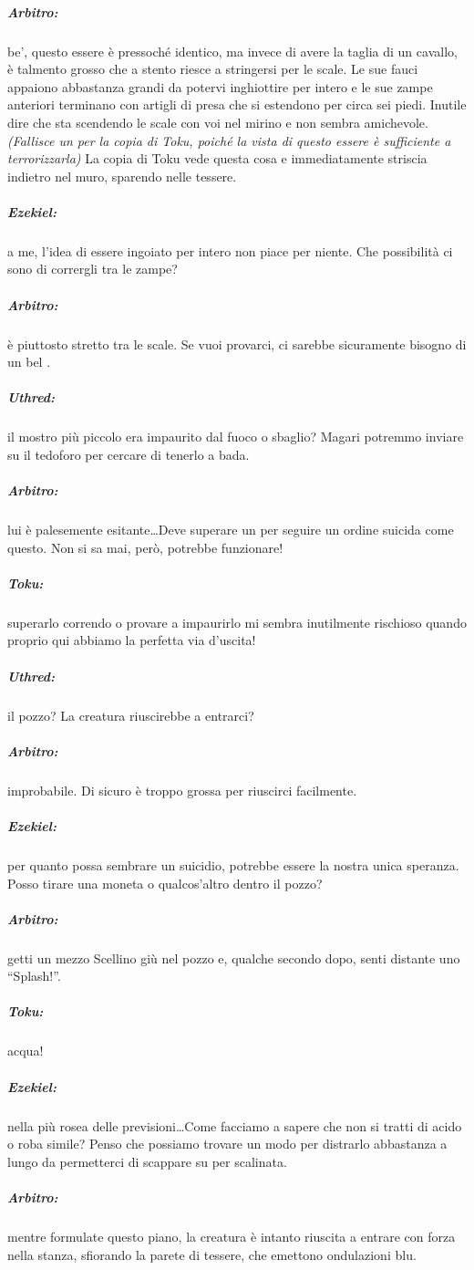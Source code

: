 \documentclass[itdr]{subfiles}
\begin{document}
{\subparagraph{Arbitro:} be', questo essere è pressoché identico, ma invece di avere la taglia di un cavallo, è talmento grosso che a stento riesce a stringersi per le scale. Le sue fauci appaiono abbastanza grandi da potervi inghiottire per intero e le sue zampe anteriori terminano con artigli di presa che si estendono per circa sei piedi. Inutile dire che sta scendendo le scale con voi nel mirino e non sembra amichevole. {\em (Fallisce un  per la copia di Toku, poiché la vista di questo essere è sufficiente a terrorizzarla)} La copia di Toku vede questa cosa e immediatamente striscia indietro nel muro, sparendo nelle tessere.

\subparagraph{Ezekiel:} a me, l'idea di essere ingoiato per intero non piace per niente. Che possibilità ci sono di corrergli tra le zampe?

\subparagraph{Arbitro:} è piuttosto stretto tra le scale. Se vuoi provarci, ci sarebbe sicuramente bisogno di un bel .

\subparagraph{Uthred:} il mostro più piccolo era impaurito dal fuoco o sbaglio? Magari potremmo inviare su il tedoforo per cercare di tenerlo a bada.

\subparagraph{Arbitro:} lui è palesemente esitante\ldots Deve superare un  per seguire un ordine suicida come questo. Non si sa mai, però, potrebbe funzionare!

\subparagraph{Toku:} superarlo correndo o provare a impaurirlo mi sembra inutilmente rischioso quando proprio qui abbiamo la perfetta via d'uscita!

\subparagraph{Uthred:} il pozzo? La creatura riuscirebbe a entrarci?

\subparagraph{Arbitro:} improbabile. Di sicuro è troppo grossa per riuscirci facilmente.

\subparagraph{Ezekiel:} per quanto possa sembrare un suicidio, potrebbe essere la nostra unica speranza. Posso tirare una moneta o qualcos'altro dentro il pozzo?

\subparagraph{Arbitro:} getti un mezzo Scellino giù nel pozzo e, qualche secondo dopo, senti distante uno \mbox{``Splash!''}.

\subparagraph{Toku:} acqua!

\subparagraph{Ezekiel:} nella più rosea delle previsioni\ldots Come facciamo a sapere che non si tratti di acido o roba simile? Penso che possiamo trovare un modo per distrarlo abbastanza a lungo da permetterci di scappare su per scalinata.

\subparagraph{Arbitro:} mentre formulate questo piano, la creatura è intanto riuscita a entrare con forza nella stanza, sfiorando la parete di tessere, che emettono ondulazioni blu.

}
\end{document}
